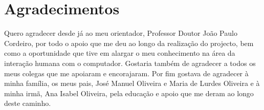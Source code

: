 \chapter*{Agradecimentos}
\label{chap:ack}

Quero agradecer desde já ao meu orientador, Professor Doutor João Paulo Cordeiro, por todo o apoio que me deu ao longo da realização do projecto, bem como a oportunidade que tive em alargar o meu conhecimento na área da interação humana com o computador.
Gostaria também de agradecer a todos os meus colegas que me apoiaram e encorajaram.
Por fim gostava de agradecer à minha família, os meus pais, José Manuel Oliveira e Maria de Lurdes Oliveira e à minha irmã, Ana Isabel Oliveira, pela educação e apoio que me deram ao longo deste caminho.

 